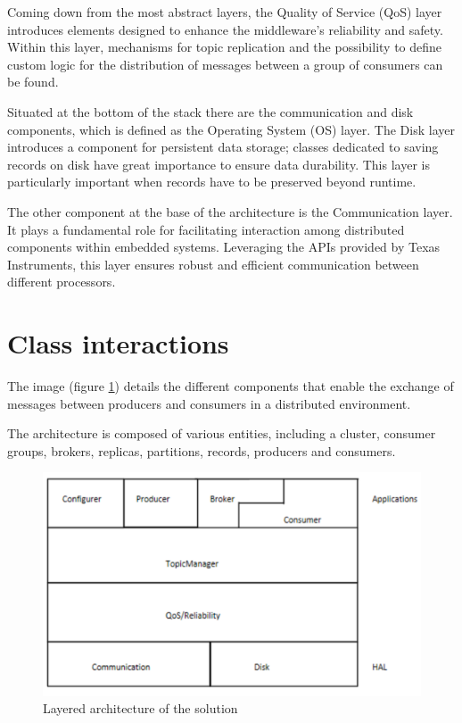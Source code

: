 Coming down from the most abstract layers, the Quality of Service (QoS) layer
introduces elements designed to enhance the middleware's reliability and
safety. Within this layer, mechanisms for topic replication and the possibility
to define custom logic for the distribution of messages between a group of
consumers can be found.

Situated at the bottom of the stack there are the communication and disk
components, which is defined as the Operating System (OS) layer.
The Disk layer introduces a component for persistent data storage; classes
dedicated to saving records on disk have great importance to ensure data
durability.
This layer is particularly important when records have to be preserved beyond
runtime.

The other component at the base of the architecture is the Communication layer.
It plays a fundamental role for facilitating interaction among distributed
components within embedded systems.
Leveraging the APIs provided by Texas Instruments, this layer ensures robust
and efficient communication between different processors.

\section{Class interactions}

The image (figure \ref{fig:class_diagram}) details the different components
that enable the exchange of messages between producers and consumers in a
distributed environment.

The architecture is composed of various entities, including a cluster,
consumer groups, brokers, replicas, partitions, records, producers and
consumers. 

\begin{figure}[H]
    \centering
    \includegraphics[width=1.0\textwidth]{Figures/architecture_layers.png}
    \caption{Layered architecture of the solution}
    \label{fig:class_diagram}
\end{figure}

